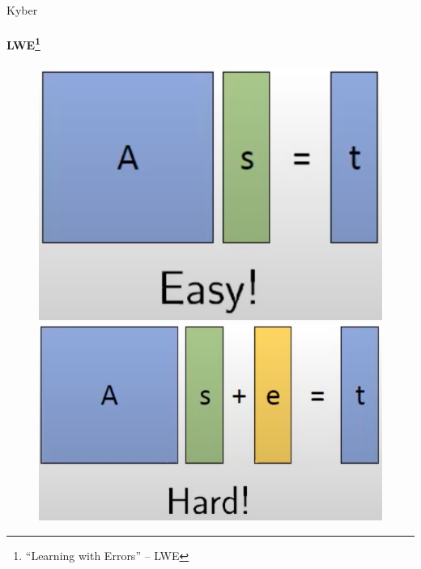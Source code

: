 \documentclass{rosenpass-beamer}
\let\say\enquote
\begin{document}
\begin{frame}{Kyber}
\framesubtitle{LWE\footnote{\say{Learning with Errors} -- LWE}}

\begin{figure}
  \begin{minipage}{.4\textwidth}
    \centering
    \includegraphics[width=\textwidth]{assets/matrix-easy.png}
  \end{minipage}\hfill
  \begin{minipage}{.4\textwidth}
    \centering
    \includegraphics[width=\textwidth]{assets/matrix-hard.png}
  \end{minipage}
\end{figure}
\end{frame}

\end{document}
